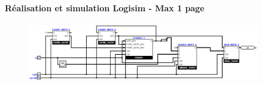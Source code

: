 \documentclass[a4paper]{article} %
\begin{document}
\begin{tcolorbox}[colframe=Monokaimagenta,colback=white]
\paragraph{Réalisation et simulation Logisim - Max 1 page}

\begin{figure}[H]
\centering
    \includegraphics[width=0.9\textwidth]{src/UART.png}
    \label{fig:countBase}
\end{figure}


\end{tcolorbox}
\end{document}
